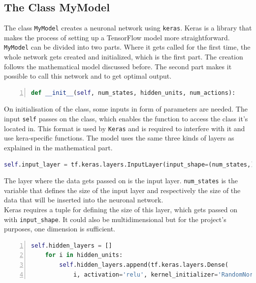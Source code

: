 \documentclass[12pt]{article}
\begin{document}
\subsection{The Class MyModel}\label{mymodel}
The class \lstinline{MyModel} creates a \gls{neuronal network} using \lstinline{keras}. Keras is a library that makes the process of setting up a TensorFlow model more straightforward. \lstinline{MyModel} can be divided into two parts. Where it gets called for the first time, the whole network gets created and initialized, which is the first part. The creation follows the mathematical model discussed before. The second part makes it possible to call this network and to get optimal output.
\lstset{ numbers=left, stepnumber=1,      firstnumber=1,  numberfirstline=true}
\begin{lstlisting}[language=Python,numbers=left, caption=Example - Creation of a \gls{neuronal network} using Keras.]
def __init__(self, num_states, hidden_units, num_actions):
\end{lstlisting}
On initialisation of the class, some \glspl{input} in form of parameters are needed. The \gls{input} \lstinline{self} passes on the class, which enables the function to access the class it's located in. This format is used by \lstinline{Keras} and is required to interfere with it and use kera-specific functions. The model uses the same three kinds of  \glspl{layer} as explained in the mathematical part.
\lstset{ numbers=left, stepnumber=1,      firstnumber=2,  numberfirstline=true}
\begin{lstlisting}[language=Python]
    self.input_layer = tf.keras.layers.InputLayer(input_shape=(num_states,))
\end{lstlisting}
The layer where the data gets passed on is the \gls{input layer}. \lstinline{num_states} is the variable that defines the size of the \gls{input layer} and respectively the size of the data that will be inserted into the \gls{neuronal network}. \\
Keras requires a tuple for defining the size of this layer, which gets passed on with \lstinline{input_shape}. It could also be multidimensional but for the project's purposes, one dimension is sufficient.
\lstset{ numbers=left, stepnumber=1,      firstnumber=4,  numberfirstline=true}
\begin{lstlisting}[language=Python,numbers=left]
    self.hidden_layers = []
    for i in hidden_units: 
        self.hidden_layers.append(tf.keras.layers.Dense( 
            i, activation='relu', kernel_initializer='RandomNormal')) 
\end{lstlisting}
\end{document}
